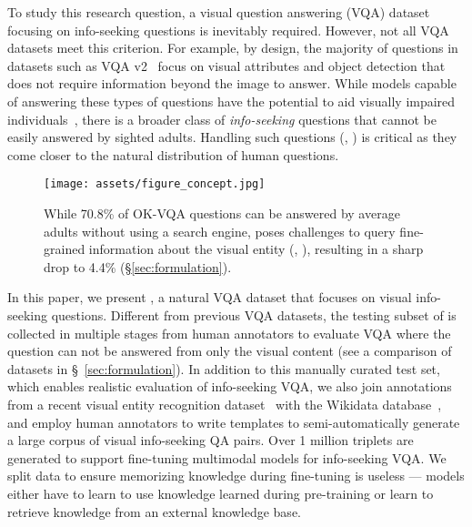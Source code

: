\documentclass[11pt]{article}
\begin{document}
To study this research question, a visual question answering (VQA) dataset focusing on info-seeking questions is inevitably required. However, not all VQA datasets meet this criterion. For example, 
by design, the majority of questions in 
datasets such as VQA v2~\cite{balanced_vqa_v2} focus on visual attributes and object detection that does not require information beyond the image to answer.
While models capable of answering these types of questions have the potential to aid visually impaired individuals~\cite{gurari2018vizwiz}, there is a broader class of {\em info-seeking} questions that cannot be easily answered by sighted adults. Handling such questions (\eg, ) is critical as they come closer to the natural distribution of human questions. 

\begin{figure}[t]
    \centering
    \texttt{[image: assets/figure\_concept.jpg]}
\caption{
        While 70.8\% of OK-VQA questions can be answered by average adults without using a search engine, \ourdataset poses challenges to query fine-grained information about the visual entity (\eg, ), resulting in a sharp drop to 4.4\% (\S\ref{sec:formulation}).
    }
\label{fig:intro_example}
\end{figure} 
In this paper, we present \infoseek, a natural VQA dataset that focuses on visual {info-seeking} questions. 
Different from previous VQA datasets, the testing subset of \ourdataset is collected in multiple stages from human annotators to evaluate VQA where the question can not be answered from only the visual content (see a comparison of datasets in \S~\ref{sec:formulation}).
In addition to this manually curated test set, which enables realistic evaluation of info-seeking VQA, we also join annotations from a recent visual entity recognition dataset~\cite{hu2023opendomain} with the Wikidata database~\cite{vrandevcic2014wikidata}, and employ human annotators to write templates to semi-automatically generate a large corpus of visual info-seeking QA pairs. 
Over 1 million  triplets are generated to support fine-tuning multimodal models for info-seeking VQA. We split data to ensure memorizing knowledge during fine-tuning is useless --- models either have to learn to use knowledge learned during pre-training or learn to retrieve knowledge from an external knowledge base.
\end{document}
